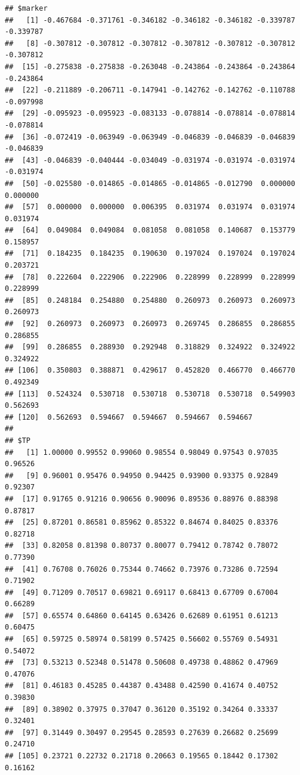 \documentclass{article}\usepackage[]{graphicx}\usepackage[]{color}
\makeatletter
\newenvironment{kframe}{%
 \def\at@end@of@kframe{}%
 \ifinner\ifhmode%
  \def\at@end@of@kframe{\end{minipage}}%
  \begin{minipage}{\columnwidth}%
 \fi\fi%
 \def\FrameCommand##1{\hskip\@totalleftmargin \hskip-\fboxsep
 \colorbox{shadecolor}{##1}\hskip-\fboxsep
     \hskip-\linewidth \hskip-\@totalleftmargin \hskip\columnwidth}%
 \MakeFramed {\advance\hsize-\width
   \@totalleftmargin\z@ \linewidth\hsize
   \@setminipage}}%
 {\par\unskip\endMakeFramed%
 \at@end@of@kframe}
\newenvironment{knitrout}{}{} %
\makeatother
\begin{document}
\begin{knitrout}
{}


\begin{kframe}\begin{verbatim}
## $marker
##   [1] -0.467684 -0.371761 -0.346182 -0.346182 -0.346182 -0.339787 -0.339787
##   [8] -0.307812 -0.307812 -0.307812 -0.307812 -0.307812 -0.307812 -0.307812
##  [15] -0.275838 -0.275838 -0.263048 -0.243864 -0.243864 -0.243864 -0.243864
##  [22] -0.211889 -0.206711 -0.147941 -0.142762 -0.142762 -0.110788 -0.097998
##  [29] -0.095923 -0.095923 -0.083133 -0.078814 -0.078814 -0.078814 -0.078814
##  [36] -0.072419 -0.063949 -0.063949 -0.046839 -0.046839 -0.046839 -0.046839
##  [43] -0.046839 -0.040444 -0.034049 -0.031974 -0.031974 -0.031974 -0.031974
##  [50] -0.025580 -0.014865 -0.014865 -0.014865 -0.012790  0.000000  0.000000
##  [57]  0.000000  0.000000  0.006395  0.031974  0.031974  0.031974  0.031974
##  [64]  0.049084  0.049084  0.081058  0.081058  0.140687  0.153779  0.158957
##  [71]  0.184235  0.184235  0.190630  0.197024  0.197024  0.197024  0.203721
##  [78]  0.222604  0.222906  0.222906  0.228999  0.228999  0.228999  0.228999
##  [85]  0.248184  0.254880  0.254880  0.260973  0.260973  0.260973  0.260973
##  [92]  0.260973  0.260973  0.260973  0.269745  0.286855  0.286855  0.286855
##  [99]  0.286855  0.288930  0.292948  0.318829  0.324922  0.324922  0.324922
## [106]  0.350803  0.388871  0.429617  0.452820  0.466770  0.466770  0.492349
## [113]  0.524324  0.530718  0.530718  0.530718  0.530718  0.549903  0.562693
## [120]  0.562693  0.594667  0.594667  0.594667  0.594667
## 
## $TP
##   [1] 1.00000 0.99552 0.99060 0.98554 0.98049 0.97543 0.97035 0.96526
##   [9] 0.96001 0.95476 0.94950 0.94425 0.93900 0.93375 0.92849 0.92307
##  [17] 0.91765 0.91216 0.90656 0.90096 0.89536 0.88976 0.88398 0.87817
##  [25] 0.87201 0.86581 0.85962 0.85322 0.84674 0.84025 0.83376 0.82718
##  [33] 0.82058 0.81398 0.80737 0.80077 0.79412 0.78742 0.78072 0.77390
##  [41] 0.76708 0.76026 0.75344 0.74662 0.73976 0.73286 0.72594 0.71902
##  [49] 0.71209 0.70517 0.69821 0.69117 0.68413 0.67709 0.67004 0.66289
##  [57] 0.65574 0.64860 0.64145 0.63426 0.62689 0.61951 0.61213 0.60475
##  [65] 0.59725 0.58974 0.58199 0.57425 0.56602 0.55769 0.54931 0.54072
##  [73] 0.53213 0.52348 0.51478 0.50608 0.49738 0.48862 0.47969 0.47076
##  [81] 0.46183 0.45285 0.44387 0.43488 0.42590 0.41674 0.40752 0.39830
##  [89] 0.38902 0.37975 0.37047 0.36120 0.35192 0.34264 0.33337 0.32401
##  [97] 0.31449 0.30497 0.29545 0.28593 0.27639 0.26682 0.25699 0.24710
## [105] 0.23721 0.22732 0.21718 0.20663 0.19565 0.18442 0.17302 0.16162

\end{verbatim}
\end{kframe}
\end{knitrout}
\end{document}
